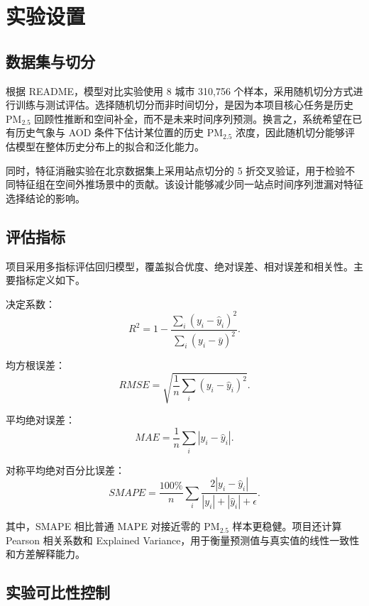\documentclass[UTF8,zihao=-4,a4paper]{ctexart}
\newcommand{\pmfine}{PM$_{2.5}$}
\newcommand{\aod}{AOD}
\begin{document}
\section{实验设置}

\subsection{数据集与切分}

根据 README，模型对比实验使用 8 城市 310,756 个样本，采用随机切分方式进行训练与测试评估。选择随机切分而非时间切分，是因为本项目核心任务是历史 \pmfine{} 回顾性推断和空间补全，而不是未来时间序列预测。换言之，系统希望在已有历史气象与 \aod{} 条件下估计某位置的历史 \pmfine{} 浓度，因此随机切分能够评估模型在整体历史分布上的拟合和泛化能力。

同时，特征消融实验在北京数据集上采用站点切分的 5 折交叉验证，用于检验不同特征组在空间外推场景中的贡献。该设计能够减少同一站点时间序列泄漏对特征选择结论的影响。

\subsection{评估指标}

项目采用多指标评估回归模型，覆盖拟合优度、绝对误差、相对误差和相关性。主要指标定义如下。

决定系数：
\begin{equation}
  R^2 = 1 - \frac{\sum_i (y_i-\hat{y}_i)^2}{\sum_i (y_i-\bar{y})^2}.
  \label{eq:r2}
\end{equation}

均方根误差：
\begin{equation}
  RMSE = \sqrt{\frac{1}{n}\sum_i (y_i-\hat{y}_i)^2}.
  \label{eq:rmse}
\end{equation}

平均绝对误差：
\begin{equation}
  MAE = \frac{1}{n}\sum_i |y_i-\hat{y}_i|.
  \label{eq:mae}
\end{equation}

对称平均绝对百分比误差：
\begin{equation}
  SMAPE = \frac{100\%}{n}\sum_i \frac{2|y_i-\hat{y}_i|}{|y_i|+|\hat{y}_i|+\epsilon}.
  \label{eq:smape}
\end{equation}

其中，SMAPE 相比普通 MAPE 对接近零的 \pmfine{} 样本更稳健。项目还计算 Pearson 相关系数和 Explained Variance，用于衡量预测值与真实值的线性一致性和方差解释能力。

\subsection{实验可比性控制}
\end{document}
